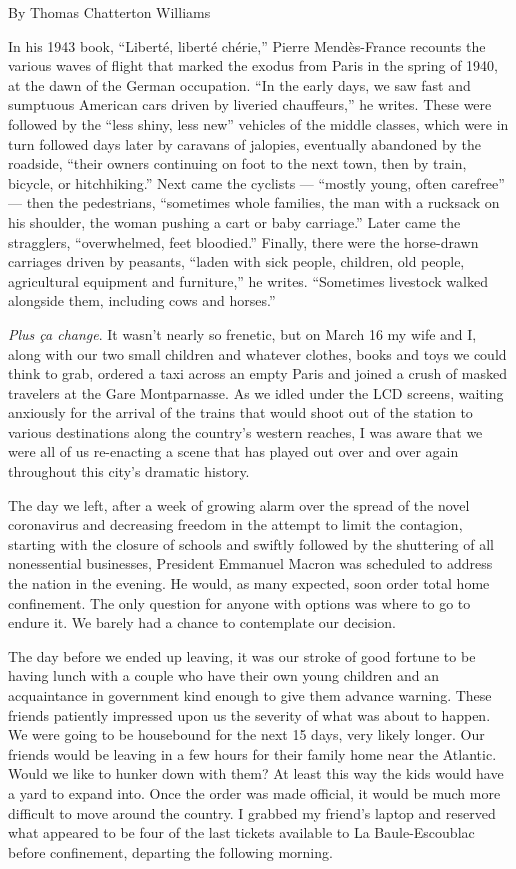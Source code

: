 By Thomas Chatterton Williams

In his 1943 book, ``Liberté, liberté chérie,'' Pierre Mendès-France
recounts the various waves of flight that marked the exodus from Paris
in the spring of 1940, at the dawn of the German occupation. ``In the
early days, we saw fast and sumptuous American cars driven by liveried
chauffeurs,'' he writes. These were followed by the ``less shiny, less
new'' vehicles of the middle classes, which were in turn followed days
later by caravans of jalopies, eventually abandoned by the roadside,
``their owners continuing on foot to the next town, then by train,
bicycle, or hitchhiking.'' Next came the cyclists --- ``mostly young,
often carefree'' --- then the pedestrians, ``sometimes whole families,
the man with a rucksack on his shoulder, the woman pushing a cart or
baby carriage.'' Later came the stragglers, ``overwhelmed, feet
bloodied.'' Finally, there were the horse-drawn carriages driven by
peasants, ``laden with sick people, children, old people, agricultural
equipment and furniture,'' he writes. ``Sometimes livestock walked
alongside them, including cows and horses.''

\emph{Plus ça change}. It wasn't nearly so frenetic, but on March 16 my
wife and I, along with our two small children and whatever clothes,
books and toys we could think to grab, ordered a taxi across an empty
Paris and joined a crush of masked travelers at the Gare Montparnasse.
As we idled under the LCD screens, waiting anxiously for the arrival of
the trains that would shoot out of the station to various destinations
along the country's western reaches, I was aware that we were all of us
re-enacting a scene that has played out over and over again throughout
this city's dramatic history.

The day we left, after a week of growing alarm over the spread of the
novel coronavirus and decreasing freedom in the attempt to limit the
contagion, starting with the closure of schools and swiftly followed by
the shuttering of all nonessential businesses, President Emmanuel Macron
was scheduled to address the nation in the evening. He would, as many
expected, soon order total home confinement. The only question for
anyone with options was where to go to endure it. We barely had a chance
to contemplate our decision.

The day before we ended up leaving, it was our stroke of good fortune to
be having lunch with a couple who have their own young children and an
acquaintance in government kind enough to give them advance warning.
These friends patiently impressed upon us the severity of what was about
to happen. We were going to be housebound for the next 15 days, very
likely longer. Our friends would be leaving in a few hours for their
family home near the Atlantic. Would we like to hunker down with them?
At least this way the kids would have a yard to expand into. Once the
order was made official, it would be much more difficult to move around
the country. I grabbed my friend's laptop and reserved what appeared to
be four of the last tickets available to La Baule-Escoublac before
confinement, departing the following morning.

